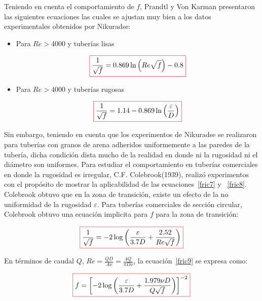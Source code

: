 \documentclass[11pt, oneside]{article}
\begin{document}
Teniendo en cuenta el comportamiento de $f$, Prandtl y Von Karman presentaron las siguientes ecuaciones las cuales se ajustan muy bien a los datos experimentales obtenidos por Nikuradse:
\begin{itemize}
\item Para $Re > 4000$ y tuber\'ias lisas

\begin{equation}
\color{red}\boxed{\color{black} \frac{1}{\sqrt{f}} = 0.869 \ln \left( Re \sqrt{f} \right ) - 0.8 }
\label{fric7}
\end{equation}

\item Para $Re > 4000$ y tuber\'ias rugosas 

\begin{equation}
\color{red}\boxed{\color{black} \frac{1}{\sqrt{f}} = 1.14 - 0.869 \ln \left( \frac{\varepsilon}{D} \right ) }
\label{fric8}
\end{equation}

\end{itemize}

Sin embargo, teniendo en cuenta que los experimentos de Nikuradse se realizaron para tuber\'ias con granos de arena adheridos uniformemente a las paredes de la tuber\'ia, dicha condici\'on dista mucho de la realidad en donde ni la rugosidad ni el di\'ametro son uniformes. Para estudiar el comportamiento en tuber\'ias comerciales en donde la rugosidad es irregular, C.F. Colebrook(1939), realiz\'o experimentos con el prop\'osito de mostrar la aplicabilidad de las ecuaciones~\ref{fric7} y ~\ref{fric8}. Colebrook obtuvo que en la zona de transici\'on, existe un efecto de la no uniformidad de la rugosidad $\varepsilon$. Para tuber\'ias comerciales de secci\'on circular, Colebrook obtuvo una ecuaci\'on implicita para $f$ para la zona de transici\'on:

\begin{equation}
\color{red}\boxed{\color{black} \frac{1}{\sqrt{f}}= -2 \log \left( \frac{\varepsilon}{3.7D} + \frac{2.52}{Re \sqrt{f}} \right) }
\label{fric9}
\end{equation}

En t\'erminos de caudal $Q$, $Re = \frac{QD}{A \nu} = \frac{4Q}{\pi D \nu}$, la ecuaci\'on~\ref{fric9} se expresa como:

\begin{equation}
\color{red}\boxed{\color{black} f  = \left[ -2 \log \left( \frac{\varepsilon}{3.7D} + \frac{1.979 \nu D}{Q \sqrt{f}} \right) \right]^{-2} }
\label{fric10}
\end{equation}
\end{document}
